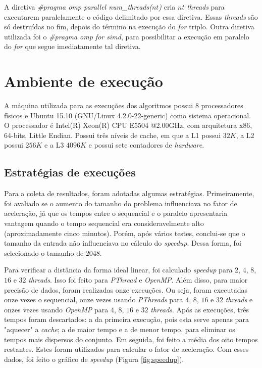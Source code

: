 \documentclass[12pt]{article}
\begin{document}
A diretiva \textit{\#pragma omp parallel num\_threads($nt$)} cria $nt$ \textit{threads} para executarem paralelamente o código delimitado por essa diretiva. Essas \textit{threads} são só destruídas no fim, depois do término na execução do \textit{for} triplo. Outra diretiva utilizada foi o \textit{\#pragma omp for simd}, para possibilitar a execução em paralelo do \textit{for} que segue imediatamente tal diretiva. 

\section{Ambiente de execução}

A máquina utilizada para as execuções dos algoritmos possui 8 processadores físicos e Ubuntu 15.10 (GNU/Linux 4.2.0-22-generic) como sistema operacional. O processador é Intel(R) Xeon(R) CPU E5504 @2.00GHz, com arquitetura x86, 64-bits, Little Endian. Possui três níveis de cache, em que a L1 possui $32K$, a L2 possui $256K$ e a L3 $4096K$ e possui sete contadores de \textit{hardware}.

\subsection{Estratégias de execuções}

Para a coleta de resultados, foram adotadas algumas estratégias. Primeiramente, foi avaliado se o aumento do tamanho do problema influenciava no fator de aceleração, já que os tempos entre o sequencial e o paralelo apresentaria vantagem quando o tempo sequencial era consideravelmente alto (aproximadamente cinco minutos). Porém, após vários testes, conclui-se que o tamanho da entrada não influenciava no cálculo do \textit{speedup}. Dessa forma, foi selecionado o tamanho de $2048$. 

Para verificar a distância da forma ideal linear, foi calculado \textit{speedup} para $2$, $4$, $8$, $16$ e $32$ \textit{threads}. Isso foi feito para \textit{PThread} e \textit{OpenMP}. Além disso, para maior precisão de dados, foram realizadas onze execuções. Ou seja, foram executadas onze vezes o sequencial, onze vezes usando \textit{PThreads} para $4$, $8$, $16$ e $32$ \textit{threads} e onzes vezes usando \textit{OpenMP} para $4$, $8$, $16$ e $32$ \textit{threads}. Após as execuções, três tempos foram descartados: a da primeira execução, pois esta serve apenas para "aquecer" a \textit{cache}; a de maior tempo e a de menor tempo, para eliminar os tempos mais dispersos do conjunto. Em seguida, foi feito a média dos oito tempos restantes. Estes foram utilizados para calcular o fator de aceleração. Com esses dados, foi feito o gráfico de \textit{speedup} (Figura \ref{fig:speedup}).
\end{document}
